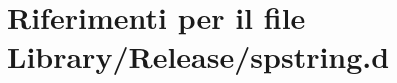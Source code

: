 \hypertarget{_release_2spstring_8d}{
\section{Riferimenti per il file Library/Release/spstring.d}
\label{_release_2spstring_8d}
}
